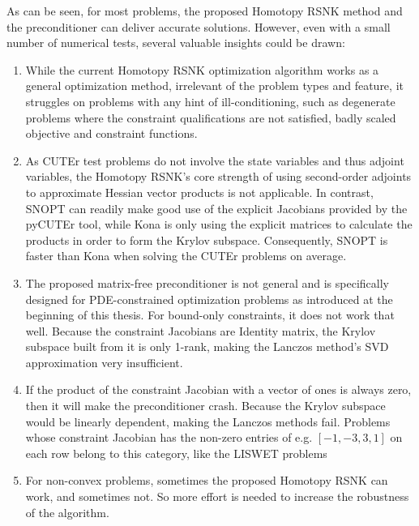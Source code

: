 As can be seen, for most problems, the proposed Homotopy RSNK method and the preconditioner can deliver accurate solutions.  However, even with a small number of numerical tests, several valuable insights could be drawn: 
\begin{enumerate}
\item While the current Homotopy RSNK optimization algorithm works as a general optimization method, irrelevant of the problem types and feature, it struggles on problems with any hint of ill-conditioning, such as degenerate problems where the constraint qualifications are not satisfied, badly scaled objective and constraint functions. 
\item As CUTEr test problems do not involve the state variables and thus adjoint variables, the Homotopy RSNK's core strength of using second-order adjoints to approximate Hessian vector products is not applicable. In contrast, SNOPT can readily make good use of the explicit Jacobians 
provided by the pyCUTEr tool, while Kona is only using the explicit matrices to calculate the products in order to form the Krylov subspace. Consequently, SNOPT is faster than Kona when solving the CUTEr problems on average.   
\item The proposed matrix-free preconditioner is not general and is specifically designed for PDE-constrained optimization problems as introduced at the beginning of this thesis.  For bound-only constraints, it does not work that well. Because the constraint Jacobians are Identity matrix, the Krylov subspace built from it is only 1-rank, making the Lanczos method's SVD approximation very insufficient.  
\item If the product of the constraint Jacobian with a vector of ones is always zero, then it will make the preconditioner crash. Because the Krylov subspace would be linearly dependent, making the Lanczos methods fail. Problems whose constraint Jacobian has the non-zero entries of e.g. $[-1, -3, 3, 1]$ on each row belong to this category, like the LISWET problems 
\item For non-convex problems, sometimes the proposed Homotopy RSNK can work, and sometimes not. So more effort is needed to increase the robustness of the algorithm. 
\end{enumerate} 




